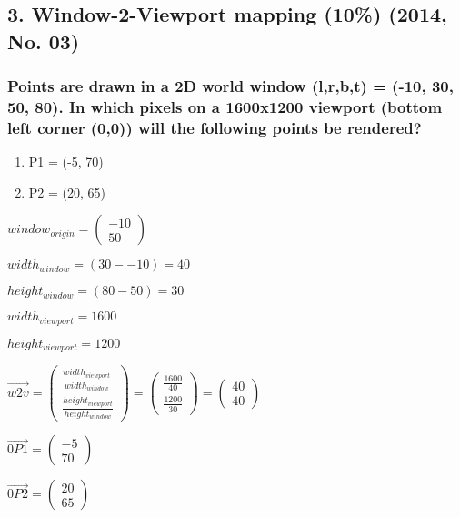 \subsection{3. Window-2-Viewport mapping (10\%) (2014, No. 03)}
\subsubsection{Points are drawn in a 2D world window (l,r,b,t) = (-10, 30, 50, 80). In which pixels on a 1600x1200 viewport (bottom left corner (0,0)) will the following points be rendered?}

\begin{enumerate}
    \item P1 = (-5, 70)
    \item P2 = (20, 65)
\end{enumerate}

$ window_{origin} = \left(\begin{array}{c}-10\\50\end{array}\right)$

$ width_{window} = (30 - -10) = 40 $

$ height_{window} = (80 - 50) = 30 $

$ width_{viewport} = 1600 $

$ height_{viewport} = 1200 $

$ \vec{w2v} = \left(\begin{array}{c}
 \frac{width_{viewport}}{width_{window}}\\
 \frac{height_{viewport}}{height_{window}}
\end{array}\right)
=
\left(\begin{array}{c}
 \frac{1600}{40}\\
 \frac{1200}{30}
\end{array}\right)
=
\left(\begin{array}{c}
 40\\
 40
\end{array}\right)
$

$
\vec{0P1} 
=
\left(\begin{array}{c}
-5\\
70
\end{array}\right)
$

$
\vec{0P2} 
=
\left(\begin{array}{c}
20\\
65
\end{array}\right)
$




